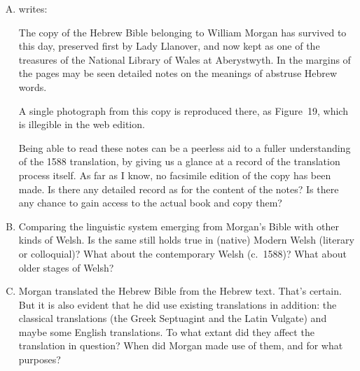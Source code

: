 \begin{enumerate}[A.]
	\item \cite{morgan.p:1988:beibl} writes:
		\begin{changemargin}{1cm}{0cm}
			\begin{bilingquote}
				\transline
				{}
				{The copy of the Hebrew Bible belonging to William Morgan has survived to this day, preserved first by Lady Llanover, and now kept as one of the treasures of the National Library of Wales at Aberystwyth. In the margins of the pages may be seen detailed notes on the meanings of abstruse Hebrew words.}
			\end{bilingquote}
		\end{changemargin}
		\vspace{-0.5cm}
		A single photograph from this copy is reproduced there, as Figure~19, which is illegible in the web edition.

		Being able to read these notes can be a peerless aid to a fuller understanding of the 1588 translation, by giving us a glance at a record of the translation process itself. As far as I know, no facsimile edition of the copy has been made. Is there any detailed record as for the content of the notes? Is there any chance to gain access to the actual book and copy them?

	\item Comparing the linguistic system emerging from Morgan’s Bible with other kinds of Welsh. Is the same still holds true in (native) Modern Welsh (literary or colloquial)? What about the contemporary Welsh (c.~1588)? What about older stages of Welsh?

	\item Morgan translated the Hebrew Bible from the Hebrew text. That’s certain. But it is also evident that he did use existing translations in addition: the classical translations (the Greek Septuagint and the Latin Vulgate) and maybe some English translations. To what extant did they affect the translation in question? When did Morgan made use of them, and for what purposes?


\end{enumerate}
